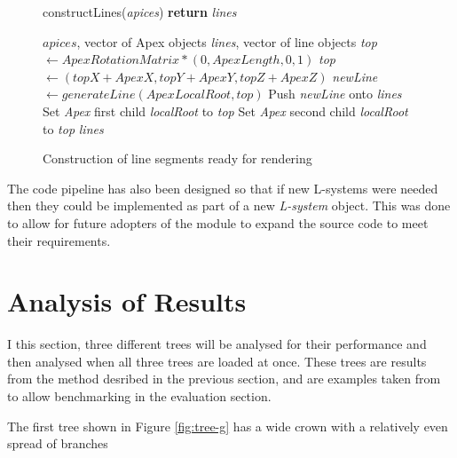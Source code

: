 \documentclass[final]{cmpreport}
\begin{document}
\begin{figure}[ht]
    \begin{algorithm}[H]
    \caption{constructLines(\emph{apices}) {\textbf{return}} \emph{lines}}
        \begin{algorithmic}[1]
        \Require $apices$, vector of Apex objects
        \Ensure \emph{lines}, vector of line objects
            \State \emph{top} $\leftarrow ApexRotationMatrix * (0, ApexLength, 0, 1)$ 
            \State \emph{top} $\leftarrow (topX + ApexX, topY + ApexY, topZ + ApexZ)$ 
            \State \emph{newLine} $\leftarrow generateLine(ApexLocalRoot, top)$ 
            \State Push \emph{newLine} onto \emph{lines}
                \State Set \emph{Apex} first child \emph{localRoot} to \emph{top}
            \EndIf
                \State Set \emph{Apex} second child \emph{localRoot} to \emph{top}
            \EndIf
        \EndFor
        \State \Return \emph{lines}
        \end{algorithmic}
    \end{algorithm}
    \caption{Construction of line segments ready for rendering}
    \label{fig:construct-lines}
\end{figure}

The code pipeline has also been designed so that if new L-systems were needed then they could 
be implemented as part of a new \emph{L-system} object. This was done to allow for future 
adopters of the module to expand the source code to meet their requirements.

\section{Analysis of Results}
I this section, three different trees will be analysed for their performance and then analysed 
when all three trees are loaded at once. These trees are results from the method desribed in 
the previous section, and are examples taken from \cite{prusinkiewicz1996systems} to allow 
benchmarking in the evaluation section.

The first tree shown in Figure \ref{fig:tree-g} has a wide crown with a relatively even spread of branches
\end{document}
